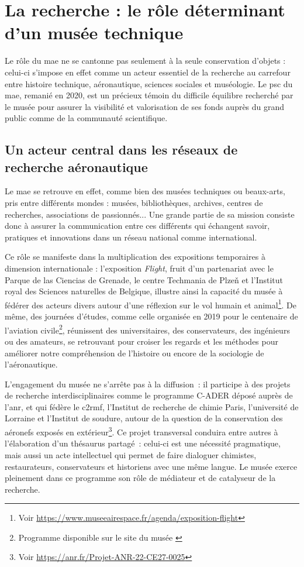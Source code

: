 \section{\label{I-A-2}La recherche : le rôle déterminant d'un musée technique}

Le rôle du \ac{mae} ne se cantonne pas seulement à la seule conservation d’objets : celui-ci s'impose en effet comme un acteur essentiel de la recherche au carrefour entre histoire technique, aéronautique, sciences sociales et muséologie.  Le \ac{psc} du \acf{mae}, remanié en 2020, est un précieux témoin du difficile équilibre recherché par le musée pour assurer la visibilité et valorisation de ses fonds auprès du grand public comme de la communauté scientifique.

\subsection{Un acteur central dans les réseaux de recherche aéronautique}

Le \ac{mae} se retrouve en effet, comme bien des musées techniques ou beaux-arts, pris entre différents mondes : musées, bibliothèques, archives, centres de recherches, associations de passionnés... Une grande partie de sa mission consiste donc à assurer la communication entre ces différents qui échangent savoir, pratiques et innovations dans un réseau national comme international.

Ce rôle se manifeste dans la multiplication des expositions temporaires à dimension internationale : l’exposition \emph{Flight}, fruit d’un partenariat avec le Parque de las Ciencias de Grenade, le centre Techmania de Plzeň et l’Institut royal des Sciences naturelles de Belgique, illustre ainsi la capacité du musée à fédérer des acteurs divers autour d’une réflexion sur le vol humain et animal\footnote{Voir \href{https://www.museeairespace.fr/agenda/exposition-flight}{https://www.museeairespace.fr/agenda/exposition-flight}}. De même, des journées d’études, comme celle organisée en 2019 pour le centenaire de l’aviation civile\footnote{Programme disponible sur le site du musée \cite{19192019CentAns}}, réunissent des universitaires, des conservateurs, des ingénieurs ou des amateurs, se retrouvant pour croiser les regards et les méthodes pour améliorer notre compréhension de l'histoire ou encore de la sociologie de l'aéronautique.

L’engagement du musée ne s’arrête pas à la diffusion : il participe à des projets de recherche interdisciplinaires comme le programme C-ADER déposé auprès de l'\ac{anr}, et qui fédère le \ac{c2rmf}, l’Institut de recherche de chimie Paris, l’université de Lorraine et l’Institut de soudure, autour de la  question de la conservation des aéronefs exposés en extérieur\footnote{Voir  \href{https://anr.fr/Projet-ANR-22-CE27-0025}{https://anr.fr/Projet-ANR-22-CE27-0025}}. Ce projet transversal conduira entre autres à l’élaboration d’un thésaurus partagé : celui-ci est une nécessité pragmatique, mais aussi un acte intellectuel qui permet de faire dialoguer chimistes, restaurateurs, conservateurs et historiens avec une même langue. Le musée exerce pleinement dans ce programme son rôle de médiateur et de catalyseur de la recherche.

